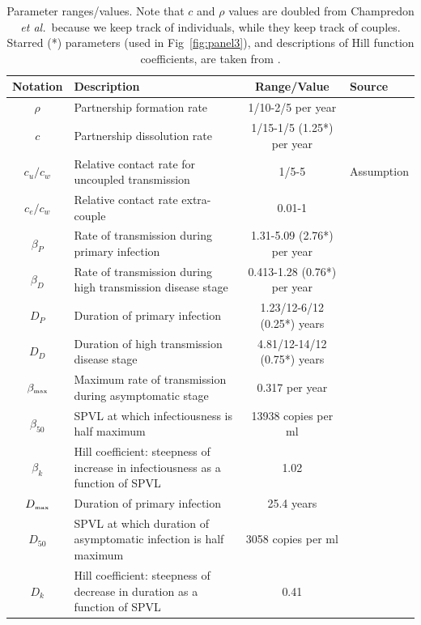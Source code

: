 \documentclass[10pt,letterpaper]{article}
\renewcommand{\figurename}{Fig}
\newcommand{\etal}{\textit{et al.}}
\newcommand{\tsub}[2]{#1_{{\textrm{\tiny #2}}}}
\begin{document}
\begin{table}[h!]
\caption{Parameter ranges/values.  Note that $c$ and $\rho$ values are doubled from Champredon \etal\  because we keep track of individuals, while they keep track of couples. Starred (*) parameters (used in \figurename~\ref{fig:panel3}), and descriptions of Hill function coefficients, are taken from \cite{shirreff_transmission_2011}.}
\centering
\begin{tabular}{c p{2in} c l}
\hline 
Notation & Description & Range/Value & Source\\
\hline %
$\rho$ & Partnership formation rate & 1/10-2/5 per year & \cite{champredon_hiv_2013} \\
$c$ & Partnership dissolution rate & 1/15-1/5 (1.25*) per year & \cite{champredon_hiv_2013} \\
$c_u/c_w$ & Relative contact rate for uncoupled transmission & 1/5-5 & Assumption \\
$c_e/c_w$ & Relative contact rate extra-couple & 0.01-1 & \cite{champredon_hiv_2013} \\
$\beta_P$ & Rate of transmission during primary infection & 1.31-5.09 (2.76*) per year & \cite{hollingsworth_hiv1_2008} \\
$\beta_D$ & Rate of transmission during high transmission disease stage & 0.413-1.28 (0.76*) per year & \cite{hollingsworth_hiv1_2008} \\
$D_P$ & Duration of primary infection & 1.23/12-6/12 (0.25*) years & \cite{hollingsworth_hiv1_2008} \\
$D_D$ & Duration of high transmission disease stage & 4.81/12-14/12 (0.75*) years & \cite{hollingsworth_hiv1_2008} \\
$\tsub{\beta}{max}$ & Maximum rate of transmission during asymptomatic stage & 0.317 per year & \cite{shirreff_transmission_2011} \\
$\beta_{50}$ & SPVL at which infectiousness is half maximum & 13938 copies per ml & \cite{shirreff_transmission_2011} \\
$\beta_k$ & Hill coefficient: steepness of increase in infectiousness as a function of SPVL & 1.02 & \cite{shirreff_transmission_2011} \\
$\tsub{D}{max}$ & Duration of primary infection & 25.4 years & \cite{shirreff_transmission_2011} \\
$D_{50}$ & SPVL at which duration of asymptomatic infection is half maximum & 3058 copies per ml & \cite{shirreff_transmission_2011} \\
$D_{k}$ & Hill coefficient: steepness of decrease in duration as a function of SPVL & 0.41 & \cite{shirreff_transmission_2011} \\

\end{tabular}
\end{table}
\end{document}
